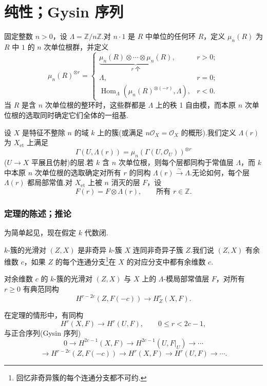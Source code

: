 ﻿%
\chapter{纯性；Gysin 序列}\label{sec:16}

固定整数 $n > 0$，设 $\Lambda = \mathbb{Z}/n\mathbb{Z}$.对 $n \cdot 1$ 是 $R$ 中单位的任何环 $R$，定义 $\mu_n(R)$ 为 $R$ 中 $1$ 的 $n$ 次单位根群，并定义
\[
\mu_n(R)^{\otimes r} = \begin{cases}
\underbrace{\mu_n(R) \otimes \cdots \otimes \mu_n(R)}_{r \text{ 个}}, & r > 0;\\
\Lambda, & r = 0;\\
\operatorname{Hom}_{\Lambda}(\mu_n(R)^{\otimes (-r)}, \Lambda), & r < 0.
\end{cases}
\]
当 $R$ 是含 $n$ 次单位根的整环时，这些群都是 $\Lambda$ 上的秩 1 自由模，而本原 $n$ 次单位根的选取同时确定它们全体的一组基.

设 $X$ 是特征不整除 $n$ 的域 $k$ 上的簇(或满足 $n\mathcal{O}_X = \mathcal{O}_X$ 的概形).我们定义 $\Lambda(r)$ 为 $X_{\mathrm{et}}$ 上满足
\[
\Gamma(U, \Lambda(r)) = \mu_n(\Gamma(U, \mathcal{O}_U))^{\otimes r}
\]
($U \to X$ 平展且仿射)的层.若 $k$ 含 $n$ 次单位根，则每个层都同构于常值层 $\Lambda$，而 $k$ 中本原 $n$ 次单位根的选取确定对所有 $r$ 的同构 $\Lambda(r) \xrightarrow{\sim} \Lambda$.无论如何，每个层 $\Lambda(r)$ 都局部常值.对 $X_{\mathrm{et}}$ 上被 $n$ 消灭的层 $F$，设
\[
F(r) = F \otimes \Lambda(r), \qquad \text{所有 } r \in \mathbb{Z}.
\]

\subsection*{定理的陈述；推论}

为简单起见，现在假定 $k$ 代数闭.

$k$-簇的光滑对 $(Z, X)$ 是非奇异 $k$-簇 $X$ 连同非奇异子簇 $Z$.我们说 $(Z, X)$ 有余维数 $c$，如果 $Z$ 的每个连通分支\footnote{回忆非奇异簇的每个连通分支都不可约.}在 $X$ 的对应分支中都有余维数 $c$.

\begin{theorem}\label{thm:16.1}
对余维数 $c$ 的 $k$-簇的光滑对 $(Z, X)$ 与 $X$ 上的 $\Lambda$-模局部常值层 $F$，对所有 $r \geq 0$ 有典范同构
\[
H^{r-2c}(Z, F(-c)) \to H^{r}_{Z}(X, F).
\]
\end{theorem}

\begin{corollary}\label{cor:16.2}
在定理的情形中，有同构
\[
H^{r}(X, F) \to H^{r}(U, F), \qquad 0 \leq r < 2c - 1,
\]
与正合序列(Gysin 序列)
\[
0 \to H^{2c-1}(X, F) \to H^{2c-1}(U, F|_{U}) \to \cdots
\]
\[
\to H^{r-2c}(Z, F(-c)) \to H^{r}(X, F) \to H^{r}(U, F) \to \cdots.
\]
\end{corollary}

